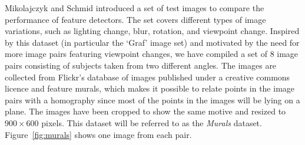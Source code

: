 \documentclass{article}
\begin{document}
Mikolajczyk and Schmid  \cite{mikolajczyk2005performance} introduced a 
set of test images to compare the performance of feature detectors. The 
set covers different types of image variations, such as lighting change, 
blur, rotation, and viewpoint change. Inspired by this dataset (in 
particular the `Graf' image set) and motivated by the need for more 
image pairs featuring viewpoint changes, we have compiled a set of 8 
image pairs consisting of subjects taken from two different angles. The 
images are collected from Flickr's database of images published under a 
creative commons licence and feature murals, which makes it possible to 
relate points in the image pairs with a homography since most of the 
points in the images will be lying on a plane.  The images have been 
cropped to show the same motive and resized to $900\times 600$ pixels.  
This dataset will be referred to as the \emph{Murals} dataset.  
Figure~\ref{fig:murals} shows one image from each pair.
\end{document}
